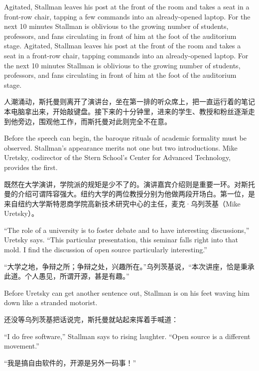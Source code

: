 \ifdefined\eng
\ifdefined\vone
Agitated, Stallman leaves his post at the front of the room and takes a seat in a front-row chair, tapping a few commands into an already-opened laptop. For the next 10 minutes Stallman is oblivious to the growing number of students, professors, and fans circulating in front of him at the foot of the auditorium stage.
\fi
\ifdefined\vtwo
Agitated, Stallman leaves his post at the front of the room and takes a seat in a front-row chair, tapping commands into an already-opened laptop. For the next 10 minutes Stallman is oblivious to the growing number of students, professors, and fans circulating in front of him at the foot of the auditorium stage.
\fi
\fi

\ifdefined\chs
人潮涌动，斯托曼则离开了演讲台，坐在第一排的听众席上，把一直运行着的笔记本电脑拿出来，开始敲键盘。接下来的十分钟里，进来的学生、教授和粉丝逐渐走到他旁边，围观他工作，而斯托曼对此则完全不在意。
\fi

\ifdefined\eng
Before the speech can begin, the baroque rituals of academic formality must be observed. Stallman's appearance merits not one but two introductions. Mike Uretsky, codirector of the Stern School's Center for Advanced Technology, provides the first.
\fi

\ifdefined\chs
既然在大学演讲，学院派的规矩是少不了的。演讲嘉宾介绍则是重要一环。对斯托曼的介绍可谓阵容强大。纽约大学的两位教授分别为他做两段开场白。第一位，是来自纽约大学斯特恩商学院高新技术研究中心的主任，麦克·乌列茨基（Mike Uretsky）。
\fi

\ifdefined\eng
``The role of a university is to foster debate and to have interesting discussions,'' Uretsky says. ``This particular presentation, this seminar falls right into that mold. I find the discussion of open source particularly interesting.''
\fi

\ifdefined\chs
``大学之地，争辩之所；争辩之处，兴趣所在。''乌列茨基说，``本次讲座，恰是秉承此道。个人愚见，所谓开源，甚是有趣。''
\fi

\ifdefined\eng
Before Uretsky can get another sentence out, Stallman is on his feet waving him down like a stranded motorist.
\fi

\ifdefined\chs
还没等乌列茨基把话说完，斯托曼就站起来挥着手喊道：
\fi

\ifdefined\eng
``I do free software,'' Stallman says to rising laughter. ``Open source is a different movement.''
\fi

\ifdefined\chs
``我是搞自由软件的，开源是另外一码事！''
\fi

